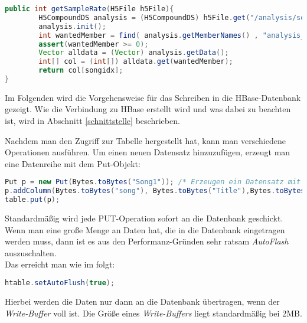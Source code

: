 \begin{lstlisting}[language=Java]
public int getSampleRate(H5File h5File){
        H5CompoundDS analysis = (H5CompoundDS) h5File.get("/analysis/songs");
        analysis.init();
        int wantedMember = find( analysis.getMemberNames() , "analysis_sample_rate");
        assert(wantedMember >= 0);
        Vector alldata = (Vector) analysis.getData();
        int[] col = (int[]) alldata.get(wantedMember);
        return col[songidx];
}
\end{lstlisting}

Im Folgenden wird die Vorgehensweise für das Schreiben in die HBase-Datenbank gezeigt. Wie die Verbindung zu HBase erstellt wird und was dabei zu beachten ist, wird in Abschnitt \ref{schnittstelle} beschrieben.

Nachdem man den Zugriff zur Tabelle hergestellt hat, kann man verschiedene Operationen ausführen.
Um einen neuen Datensatz hinzuzufügen, erzeugt man eine Datenreihe mit dem Put-Objekt:

\begin{lstlisting}[language=Java]
Put p = new Put(Bytes.toBytes("Song1")); /* Erzeugen ein Datensatz mit dem RowKey = "Song1'' */
p.addColumn(Bytes.toBytes("song"), Bytes.toBytes("Title"),Bytes.toBytes("HISTORY")); /* Erzeuge fuer diesen RowKey inder Spaltenfamileie "Song" die Splate "Title" mit dem Wert "HISTORY" */
table.put(p);
\end{lstlisting}

Standardmäßig wird jede PUT-Operation sofort an die Datenbank geschickt. Wenn man eine große Menge an Daten hat, die in die Datenbank eingetragen werden muss, dann ist es aus den Performanz-Gründen sehr ratsam \textit{AutoFlash} auszuschalten. \\
Das erreicht man wie im folgt:
\begin{lstlisting}[language=Java]
htable.setAutoFlush(true);
\end{lstlisting}
Hierbei werden die Daten nur dann an die Datenbank übertragen, wenn der \textit{Write-Buffer} voll ist. Die Größe eines \textit{Write-Buffers} liegt standardmäßig bei 2MB. 



